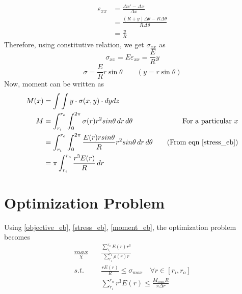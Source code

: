 \documentclass[openright,twoside]{iitkthesis}
\begin{document}
\begin{equation}
\begin{split}
\varepsilon_{xx} &= \frac{\Delta x' - \Delta x}{\Delta x}\\
&= \frac{(R+y)\Delta\theta - R\Delta\theta}{R\Delta\theta}\\
&= \frac{y}{R}
\end{split}
\end{equation}
Therefore, using constitutive relation, we get $\sigma_{xx}$ as
\begin{equation}
\sigma_{xx} = E\varepsilon_{xx} = \frac{E}{R}y
\end{equation}
\begin{equation}\label{stress_eb}
\sigma = \frac{E}{R}r\sin\theta \qquad (y = r\sin\theta)
\end{equation}
Now, moment can be written as
\begin{equation}\label{moment_eb}
\begin{split}
M(x) &= \int\int y\cdot\sigma(x,y)\cdot dydz\\
M &= \int_{r_i}^{r_o}\int_0^{2\pi}\sigma(r)r^2 sin\theta\,dr\,d\theta & \text{For a particular $x$}\\
&=\int_{r_i}^{r_o}\int_0^{2\pi} \frac{E(r)r sin\theta}{R}r^2 sin\theta\,dr\,d\theta &\quad (\text{From eqn }\eqref{stress_eb})\\
&=\pi\int_{r_i}^{r_o}\frac{r^3 E(r)}{R}\,dr
\end{split}
\end{equation}

\section{Optimization Problem}
Using \eqref{objective_eb}, \eqref{stress_eb}, \eqref{moment_eb}, the optimization problem becomes\\
\begin{equation}
\begin{split}
\underset{\chi}{max} \quad& \frac{\sum^{r_o}_{r_i}E(r)r^3}{\sum^{r_o}_{r_i}\rho(r)r}\\
s.t. \quad& \frac{rE(r)}{R}\leq \sigma_{max} \quad \forall r \in [r_i, r_o]\\
& \sum_{r_i}^{r_o}r^3E(r)\leq \frac{M_{max}R}{\pi\Delta r}
\end{split}
\end{equation}
\end{document}
